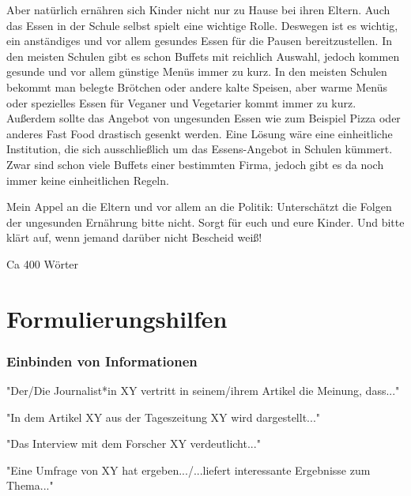 Aber natürlich ernähren sich Kinder nicht nur zu Hause bei ihren Eltern. Auch das Essen in der Schule selbst spielt eine wichtige Rolle. Deswegen ist es wichtig, ein anständiges und vor allem gesundes Essen für die Pausen bereitzustellen. In den meisten Schulen gibt es schon Buffets mit reichlich Auswahl, jedoch kommen gesunde und vor allem günstige Menüs immer zu kurz. In den meisten Schulen bekommt man belegte Brötchen oder andere kalte Speisen, aber warme Menüs oder spezielles Essen für Veganer und Vegetarier kommt immer zu kurz. Außerdem sollte das Angebot von ungesunden Essen wie zum Beispiel Pizza oder anderes Fast Food drastisch gesenkt werden. Eine Lösung wäre eine einheitliche Institution, die sich ausschließlich um das Essens-Angebot in Schulen kümmert. Zwar sind schon viele Buffets einer bestimmten Firma, jedoch gibt es da noch immer keine einheitlichen Regeln. 

Mein Appel an die Eltern und vor allem an die Politik: Unterschätzt die Folgen der ungesunden Ernährung bitte nicht. Sorgt für euch und eure Kinder. Und bitte klärt auf, wenn jemand darüber nicht Bescheid weiß! 

Ca 400 Wörter 

\section{Formulierungshilfen}
\subsubsection{Einbinden von Informationen }
\begin{compactitem}
    \item "Der/Die Journalist*in XY vertritt in seinem/ihrem Artikel die Meinung, dass..." 
    \item "In dem Artikel XY aus der Tageszeitung XY wird dargestellt..." 
    \item "Das Interview mit dem Forscher XY verdeutlicht..." 
    \item "Eine Umfrage von XY hat ergeben.../...liefert interessante Ergebnisse zum Thema..." 
\end{compactitem}
